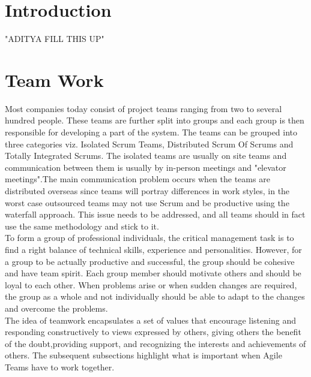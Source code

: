 \documentclass[sigplan,screen]{acmart}
\begin{document}
%
\maketitle

\section{Introduction}
"ADITYA FILL THIS UP"  

\section{Team Work}
Most companies today consist of project teams ranging from two to several hundred people. These teams are further split into groups and each group is then responsible for developing a part of the system. The teams can be grouped into three categories viz. Isolated Scrum Teams, Distributed Scrum Of Scrums and Totally Integrated Scrums\cite{Jeff}. The isolated teams are usually on site teams and communication between them is usually by in-person meetings and "elevator meetings".The main communication problem occurs when the teams are distributed overseas since teams will portray differences in work styles, in the worst case outsourced teams may not use Scrum and be productive using the waterfall approach. This issue needs to be addressed, and all teams should in fact use the same methodology and stick to it.\\
To form a group of professional individuals, the critical management task is to find a right balance of technical skills, experience and personalities. However, for a group to be actually productive and successful, the group should be cohesive and have team spirit\cite{ian}. Each group member should motivate others and should be loyal to each other. When problems arise or when sudden changes are required, the group as a whole and not individually should be able to adapt to the changes and overcome the problems.\\
The idea of teamwork encapsulates a set of values that encourage listening and responding constructively to views expressed by others, giving others the benefit of the doubt,providing support, and recognizing the interests and achievements of others\cite{Moe}.
The subsequent subsections highlight what is important when Agile Teams have to work together. 
\end{document}
